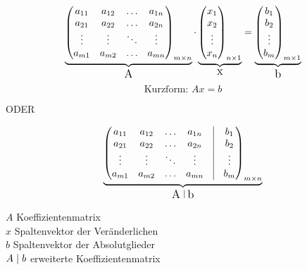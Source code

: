 \documentclass{article}
\newcommand{\smsp}{\phantom{\hspace{3px}}}
\renewcommand{\st}{\smsp | \smsp}
\begin{document}
\begin{equation*}
    \underbrace{
        \begin{pmatrix}
            a_{11} & a_{12} & \dots & a_{1n}\\
            a_{21} & a_{22} & \dots & a_{2n}\\
            \vdots & \vdots & \ddots & \vdots\\
            a_{m1} & a_{m2} & \dots & a_{mn}
        \end{pmatrix}_{m \times n}
    }_{\text{\large A}}
    \cdot
    \underbrace{
        \begin{pmatrix}
            x_1\\
            x_2\\
            \vdots\\
            x_n
        \end{pmatrix}_{n \times 1}
    }_{\text{\large x}}
    =
    \underbrace{\begin{pmatrix}
        b_1\\
        b_2\\
        \vdots\\
        b_m
    \end{pmatrix}_{m \times 1}
    }_{\text{\large b}}
\end{equation*}
\begin{equation*}
    \text{Kurzform: } Ax = b
\end{equation*}
\begin{center}
    ODER
\end{center}
\begin{equation*}
    \underbrace{
        \begin{pmatrix}
            a_{11} & a_{12} & \dots & a_{1n} & \vline & b_1\\
            a_{21} & a_{22} & \dots & a_{2n} & \vline & b_2\\
            \vdots & \vdots & \ddots & \vdots & \vline & \vdots\\
            a_{m1} & a_{m2} & \dots & a_{mn} & \vline & b_m
        \end{pmatrix}_{m \times n}
    }_{\text{\large A \vline \smsp b}}
\end{equation*}

$A$ Koeffizientenmatrix\\
$x$ Spaltenvektor der Veränderlichen\\
$b$ Spaltenvektor der Absolutglieder\\
$A \st b$ erweiterte Koeffizientenmatrix
\end{document}
